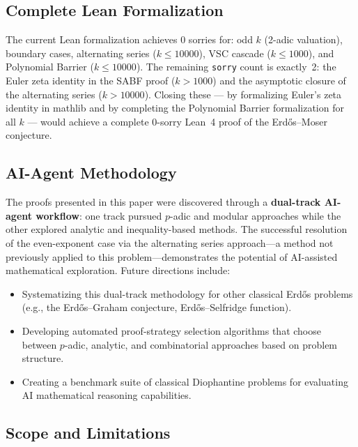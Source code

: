 \documentclass[12pt,a4paper]{article}
\theoremstyle{plain}
\theoremstyle{definition}
\begin{document}
\subsection{Complete Lean Formalization}
\label{sec:future-lean}

The current Lean formalization achieves 0 sorries for:
odd $k$ (2-adic valuation), boundary cases, alternating series
($k \le 10000$), VSC cascade ($k \le 1000$), and Polynomial Barrier
($k \le 10000$).  The remaining \texttt{sorry} count is exactly~2:
the Euler zeta identity in the SABF proof ($k > 1000$) and the asymptotic
closure of the alternating series ($k > 10000$).  Closing these --- by
formalizing Euler's zeta identity in mathlib and by completing the
Polynomial Barrier formalization for all $k$ --- would achieve a complete
0-sorry Lean~4 proof of the Erd\H{o}s--Moser conjecture.

\subsection{AI-Agent Methodology}
\label{sec:future-ai}

The proofs presented in this paper were discovered through a
\textbf{dual-track AI-agent workflow}: one track pursued $p$-adic
and modular approaches while the other explored analytic and
inequality-based methods.  The successful resolution of the
even-exponent case via the alternating series approach---a method
not previously applied to this problem---demonstrates the potential
of AI-assisted mathematical exploration.  Future directions include:
\begin{itemize}[nosep]
  \item Systematizing this dual-track methodology for other
    classical Erd\H{o}s problems (e.g., the Erd\H{o}s--Graham
    conjecture, Erd\H{o}s--Selfridge function).
  \item Developing automated proof-strategy selection algorithms
    that choose between $p$-adic, analytic, and combinatorial
    approaches based on problem structure.
  \item Creating a benchmark suite of classical Diophantine problems
    for evaluating AI mathematical reasoning capabilities.
\end{itemize}

\subsection{Scope and Limitations}
\label{sec:future-limits}
\end{document}
